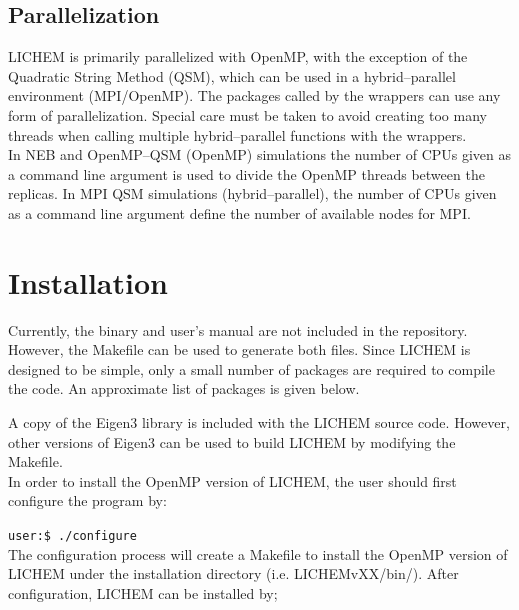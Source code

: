 \documentclass[12pt]{report}
\begin{document}
\subsection{Parallelization}

LICHEM is primarily parallelized with OpenMP, with the exception
of the Quadratic String Method (QSM), which can be used in a
hybrid--parallel environment (MPI/OpenMP).  The packages called by the
wrappers can use any form of parallelization. 
Special care must be taken to avoid creating too many threads when calling
multiple hybrid--parallel functions with the wrappers. \\

In NEB and OpenMP--QSM (OpenMP) simulations the number of CPUs given as a
command line argument is used to divide the OpenMP threads between the replicas.
In MPI QSM simulations (hybrid--parallel), the number of CPUs given as a
command line argument define the number of available nodes for MPI.

\section{Installation}

Currently, the binary and user's manual are not included in the repository.
However, the Makefile can be used to generate both files.
Since LICHEM is designed to be simple, only a small number of packages are
required to compile the code.
An approximate list of packages is given below.
\begin{quote}
\end{quote}

A copy of the Eigen3 library is included with the LICHEM source code.
However, other versions of Eigen3 can be used to build LICHEM by modifying
the Makefile. \\

In order to install the OpenMP version of LICHEM, the user should first
configure the program by: 

\texttt{user:\$ ./configure}\\

The configuration process will create a 
Makefile to install the OpenMP version of 
LICHEM under the installation directory 
(i.e. LICHEMvXX/bin/). 
After configuration, LICHEM can be installed 
by;\\
\end{document}
